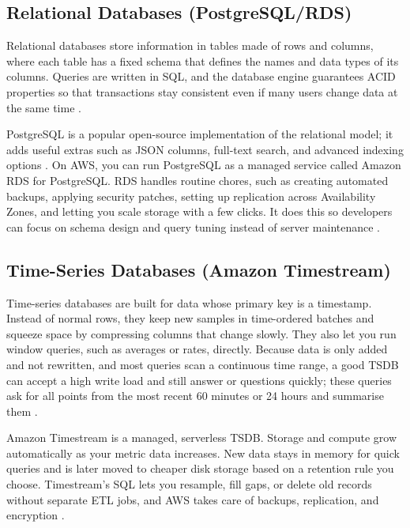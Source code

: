 \documentclass[nomenclature, english, biblatex]{kththesis}
\numberwithin{listing}{chapter}
\begin{document}
\subsection{Relational Databases (PostgreSQL/RDS)}
Relational databases store information in tables made of rows and columns, where each table has a fixed schema that defines the names and data types of its columns. Queries are written in SQL, and the database engine guarantees \gls{ACID} properties so that transactions stay consistent even if many users change data at the same time \cite[Chs.~1–2]{Silberschatz2020DB}.

PostgreSQL is a popular open-source implementation of the relational model; it adds useful extras such as JSON columns, full-text search, and advanced indexing options \cite[Ch.~27]{Silberschatz2020DB}. On AWS, you can run PostgreSQL as a managed service called Amazon RDS for PostgreSQL. RDS handles routine chores, such as creating automated backups, applying security patches, setting up replication across Availability Zones, and letting you scale storage with a few clicks. It does this so developers can focus on schema design and query tuning instead of server maintenance \cite{AWSRDSPostgreSQL}.


\subsection{Time-Series Databases (Amazon Timestream)}
Time-series databases are built for data whose primary key is a timestamp. Instead of normal rows, they keep new samples in time-ordered batches and squeeze space by compressing columns that change slowly. They also let you run window queries, such as averages or rates, directly. Because data is only added and not rewritten, and most queries scan a continuous time range, a good TSDB can accept a high write load and still answer  or  questions quickly; these queries ask for all points from the most recent 60 minutes or 24 hours and summarise them \cite[Chs.~3 \& 11]{Kleppmann2017DDIA}.

Amazon Timestream is a managed, serverless \gls{TSDB}. Storage and compute grow automatically as your metric data increases. New data stays in memory for quick queries and is later moved to cheaper disk storage based on a retention rule you choose. Timestream's SQL lets you resample, fill gaps, or delete old records without separate \gls{ETL} jobs, and AWS takes care of backups, replication, and encryption \cite{AWSTimestreamDoc}.
\end{document}
